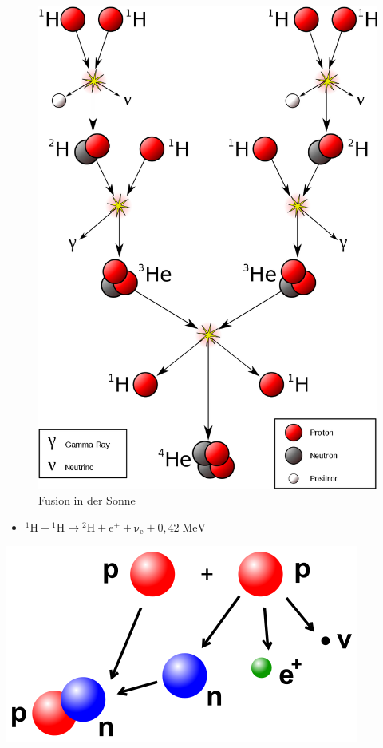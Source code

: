\documentclass[10pt,a4paper, ngerman]{beamer}
\begin{document}
\begin{frame}[fragile]{\subsecname}{\secname}
\begin{figure}
\centering
\includegraphics[height=0.8\textheight]{fusion-in-der-sonne}
\caption{Fusion in der Sonne}
\label{fig:fusion-in-der-sonne}
\end{figure}
\end{frame}

\begin{frame}{\subsecname}{\secname}
\begin{itemize}
\item \({\displaystyle \mathrm {{}^{1}H+{}^{1}H\to {}^{2}H+e^{+}+\nu _{e}+0{,}42\;MeV} }\)
\end{itemize}
\centering
\includegraphics[height=0.4\textheight]{fids1}
\end{frame}
\end{document}

